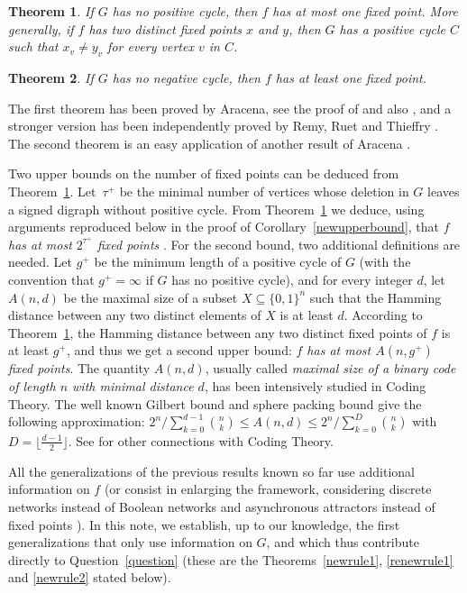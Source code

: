 \documentclass[11pt,a4paper]{article}
\newtheorem{theorem}{Theorem}
\def\B{\{0,1\}}
\begin{document}
\begin{theorem}\label{rule1}
If $G$ has no positive cycle, then $f$ has at most one fixed point. More generally, if $f$ has two distinct fixed points $x$ and $y$, then $G$ has a positive cycle $C$ such that $x_v\neq y_v$ for every vertex $v$ in $C$.
\end{theorem}

\begin{theorem}\label{rule2}
If $G$ has no negative cycle, then $f$ has at least one fixed point.
\end{theorem}

The first theorem has been proved by Aracena, see the proof of \cite[Theorem 9]{A08} and also \cite{ADG04a}, and a stronger version has been independently proved by Remy, Ruet and Thieffry \cite[Theorem 3.2]{RRT08}. The second theorem is an easy application of another result of Aracena \cite[Theorem 6]{A08}.

\medskip
Two upper bounds on the number of fixed points can be deduced from Theorem~\ref{rule1}. Let~$\tau^+$ be the minimal number of vertices whose deletion in $G$ leaves a signed digraph without positive cycle. From Theorem~\ref{rule1} we deduce, using arguments reproduced below in the proof of Corollary~\ref{newupperbound}, that {\em $f$ has at most $2^{\tau^+}$ fixed points} \cite[Theorem 9]{A08}. For the second bound, two additional definitions are needed. Let $g^+$ be the minimum length of a positive cycle of $G$ (with the convention that $g^+=\infty$ if $G$ has no positive cycle), and for every integer $d$, let $A(n,d)$ be the maximal size of a subset $X\subseteq\B^n$ such that the Hamming distance between any two distinct elements of $X$ is at least $d$. According to Theorem~\ref{rule1}, the Hamming distance between any two distinct fixed points of $f$ is at least $g^+$, and thus we get a second upper bound: {\em $f$ has at most $A(n,g^+)$ fixed points}. The quantity $A(n,d)$, usually called {\em maximal size of a binary code of length $n$ with minimal distance $d$}, has been intensively studied in Coding Theory. The well known Gilbert bound and sphere packing bound give the following approximation: $2^{n}/\sum_{k=0}^{d-1}{n \choose k}\leq A(n,d)\leq 2^{n}/\sum_{k=0}^D{n \choose k}$ with $D={\lfloor\frac{d-1}{2}\rfloor}$. See \cite{GRR15} for other connections with Coding Theory. 



\medskip
All the generalizations of the previous results known so far use additional information on $f$ \cite{RRT08,R10} (or consist in enlarging the framework, considering discrete networks instead of Boolean networks and asynchronous attractors instead of fixed points \cite{RC07,R10}). In this note, we establish, up to our knowledge, the first generalizations that only use information on $G$, and which thus contribute directly to Question~\ref{question} (these are the Theorems~\ref{newrule1}, \ref{renewrule1} and \ref{newrule2} stated below).
\end{document}
